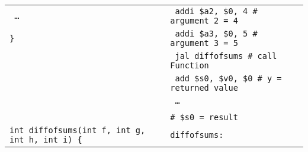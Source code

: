 \documentclass[../main.tex]{subfiles}
\begin{document}
\begin{table}[h!]
\begin{tabular}{ l l }
        \texttt{\hspace*{0cm} \hspace*{0cm} \hspace*{0cm} \hspace*{0cm} \dots} & \texttt{\hspace*{0cm} \hspace*{0cm} \hspace*{0cm} \hspace*{0cm} addi \$a2, \$0, 4 \hspace*{0cm} \hspace*{0cm} \hspace*{0cm} \# argument 2 = 4} \\
        \texttt{\}} & \texttt{\hspace*{0cm} \hspace*{0cm} \hspace*{0cm} \hspace*{0cm} addi \$a3, \$0, 5 \hspace*{0cm} \hspace*{0cm} \hspace*{0cm} \# argument 3 = 5} \\
        & \texttt{\hspace*{0cm} \hspace*{0cm} \hspace*{0cm} \hspace*{0cm} jal \hspace*{0cm} diffofsums \hspace*{0cm} \hspace*{0cm} \hspace*{0cm} \# call Function} \\
        & \texttt{\hspace*{0cm} \hspace*{0cm} \hspace*{0cm} \hspace*{0cm} add \hspace*{0cm} \$s0, \$v0, \$0 \hspace*{0cm} \# y = returned value} \\
        & \texttt{\hspace*{0cm} \hspace*{0cm} \hspace*{0cm} \hspace*{0cm} \dots} \\
        \\
        & \texttt{\# \$s0 = result} \\
        \texttt{int diffofsums(int f, int g, int h, int i) \{} & \texttt{diffofsums:} \\

\end{tabular}
\end{table}
\end{document}

